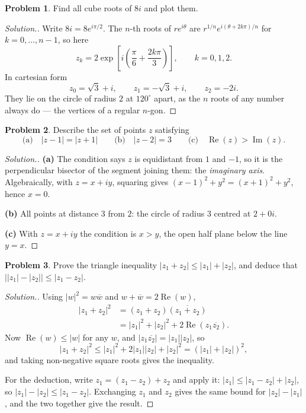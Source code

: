 \documentclass[11pt,a4paper]{article}
\theoremstyle{definition}
\newtheorem{problemx}{Problem}[section]
\newenvironment{problem}{\begin{problemx}}{\end{problemx}}
\newenvironment{solution}
  {\renewcommand{\qedsymbol}{}\begin{proof}[\textit{Solution}.]}
  {\end{proof}}
\begin{document}
\begin{problem}
Find all cube roots of $8i$ and plot them.
\end{problem}
\begin{solution}
Write $8i=8e^{i\pi/2}$. The $n$-th roots of $re^{i\theta}$ are
$r^{1/n}e^{i(\theta+2k\pi)/n}$ for $k=0,\dots,n-1$, so here
$$z_k=2\exp\left[i\left(\frac{\pi}{6}+\frac{2k\pi}{3}\right)\right],
\qquad k=0,1,2 .$$
In cartesian form
$$z_0=\sqrt3+i,\qquad z_1=-\sqrt3+i,\qquad z_2=-2i .$$
They lie on the circle of radius $2$ at $120^{\circ}$ apart, as the $n$ roots of
any number always do --- the vertices of a regular $n$-gon.
\end{solution}

\begin{problem}
Describe the set of points $z$ satisfying
$$\text{(a)}\quad \left|z-1\right|=\left|z+1\right|\qquad
\text{(b)}\quad \left|z-2\right|=3\qquad
\text{(c)}\quad \operatorname{Re}(z)>\operatorname{Im}(z).$$
\end{problem}
\begin{solution}
\textbf{(a)} The condition says $z$ is equidistant from $1$ and $-1$, so it is
the perpendicular bisector of the segment joining them: the \emph{imaginary
axis}. Algebraically, with $z=x+iy$, squaring gives
$(x-1)^2+y^2=(x+1)^2+y^2$, hence $x=0$.

\textbf{(b)} All points at distance $3$ from $2$: the circle of radius $3$
centred at $2+0i$.

\textbf{(c)} With $z=x+iy$ the condition is $x>y$, the open half plane below the
line $y=x$.
\end{solution}

\begin{problem}
Prove the triangle inequality $\left|z_1+z_2\right|\leq\left|z_1\right|+\left|z_2\right|$,
and deduce that
$\big|\left|z_1\right|-\left|z_2\right|\big|\leq\left|z_1-z_2\right|$.
\end{problem}
\begin{solution}
Using $\left|w\right|^2=w\overline{w}$ and
$w+\overline{w}=2\operatorname{Re}(w)$,
\begin{align*}
\left|z_1+z_2\right|^2&=(z_1+z_2)\overline{(z_1+z_2)}\\
&=\left|z_1\right|^2+\left|z_2\right|^2+2\operatorname{Re}\left(z_1\overline{z_2}\right).
\end{align*}
Now $\operatorname{Re}(w)\leq\left|w\right|$ for any $w$, and
$\left|z_1\overline{z_2}\right|=\left|z_1\right|\left|z_2\right|$, so
$$\left|z_1+z_2\right|^2\leq\left|z_1\right|^2+2\left|z_1\right|\left|z_2\right|
+\left|z_2\right|^2=\left(\left|z_1\right|+\left|z_2\right|\right)^2 ,$$
and taking non-negative square roots gives the inequality.

For the deduction, write $z_1=(z_1-z_2)+z_2$ and apply it:
$\left|z_1\right|\leq\left|z_1-z_2\right|+\left|z_2\right|$, so
$\left|z_1\right|-\left|z_2\right|\leq\left|z_1-z_2\right|$. Exchanging
$z_1$ and $z_2$ gives the same bound for
$\left|z_2\right|-\left|z_1\right|$, and the two together give the result.
\end{solution}
\end{document}

